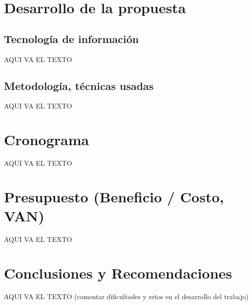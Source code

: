 \documentclass[preprint,12pt]{elsarticle}
\begin{document}
\section{Desarrollo de la propuesta}
	\subsection{Tecnología de información }	
		AQUI VA EL TEXTO
	\subsection{Metodología, técnicas usadas }	
		AQUI VA EL TEXTO

\section{Cronograma}
AQUI VA EL TEXTO
	
\section{Presupuesto (Beneficio / Costo, VAN)}
AQUI VA EL TEXTO

\section{Conclusiones y Recomendaciones }
AQUI VA EL TEXTO
(comentar dificultades y retos en el desarrollo del trabajo)



	
	\newpage
	


	
\end{document}
